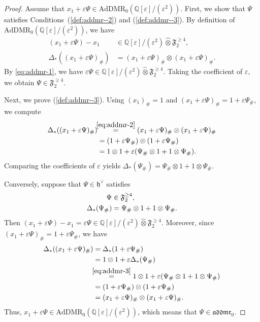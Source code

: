 \documentclass[15pt,oneside,reqno]{amsart}
\theoremstyle{remark}{
\newtheorem{lem}[df]{Lemma}
\newtheorem{prop}[df]{Proposition}
\newtheorem{ex}[df]{Example}
\newtheorem{rmk}[df]{Remark}
}
\newcommand{\ide}[1]{\mathfrak{#1}}
\newcommand{\Q}{\mathbb{Q}}
\newcommand{\AdDMR}{\mathrm{AdDMR}}
\newcommand{\addmr}{\mathfrak{addmr}}
\newcommand{\cotimes}{\widehat{\otimes}}
\begin{document}
\begin{proof}
Assume that $x_1 + \varepsilon \Psi \in \AdDMR_0(\Q[\varepsilon]/(\varepsilon^{2}))$.
First, we show that $\Psi$ satisfies Conditions~(\ref{def:addmr--2}) and (\ref{def:addmr--3}).
By definition of $\AdDMR_0(\Q[\varepsilon]/(\varepsilon^{2}))$, we have
\begin{align}
(x_1 + \varepsilon \Psi) - x_1  &\in \Q[\varepsilon]/(\varepsilon^2) \cotimes \ide{F}_2^{\ge 4}, \label{eq:addmr-1}\\
\Delta_{*} ((x_1 + \varepsilon \Psi)_{\#})
&= (x_1 + \varepsilon \Psi)_{\#} \otimes (x_1 + \varepsilon \Psi)_{\#}. \label{eq:addmr-2}
\end{align}
By \eqref{eq:addmr-1}, we have $\varepsilon\Psi\in \Q[\varepsilon]/(\varepsilon^2)\cotimes \ide{F}_2^{\ge 4}$.
Taking the coefficient of $\varepsilon$, we obtain $\Psi\in \ide{F}_2^{\ge 4}$.

Next, we prove (\ref{def:addmr--3}).
Using $(x_1)_{\#}=1$ and $(x_1+\varepsilon\Psi)_{\#}=1+\varepsilon\Psi_{\#}$, we compute
\begin{align*}
\Delta_{*}((x_1 + \varepsilon \Psi)_{\#})
&\hspace{-0.15cm}\stackrel{\eqref{eq:addmr-2}}{=} (x_1 + \varepsilon \Psi)_{\#}\otimes (x_1 + \varepsilon \Psi)_{\#} \\
&=(1 + \varepsilon \Psi_{\#})\otimes (1 + \varepsilon \Psi_{\#})\\
&= 1\otimes 1 + \varepsilon(\Psi_{\#} \otimes 1 + 1\otimes \Psi_{\#}).
\end{align*}
Comparing the coefficients of $\varepsilon$ yields $\Delta_{*}(\Psi_{\#}) = \Psi_{\#} \otimes 1 + 1 \otimes \Psi_{\#}$.

Conversely, suppose that $\Psi \in\ide{h}^{\vee}$ satisfies
\begin{align}
\Psi &\in \ide{F}_2^{\ge4}, \notag\\
\Delta_*(\Psi_\#) &= \Psi_\#\otimes1+1\otimes\Psi_\#. \label{eq:addmr-3}
\end{align}
Then $(x_1+\varepsilon\Psi)-x_1=\varepsilon\Psi\in \Q[\varepsilon]/(\varepsilon^2)\cotimes \ide{F}_2^{\ge4}$.
Moreover, since $(x_1+\varepsilon\Psi)_\#=1+\varepsilon\Psi_\#$, we have
\begin{align*}
\Delta_{*}((x_1 + \varepsilon \Psi)_{\#})
&= \Delta_*(1 + \varepsilon \Psi_{\#}) \\
&= 1\otimes 1 + \varepsilon \Delta_* (\Psi_{\#})\\
&\hspace{-0.15cm}\stackrel{\eqref{eq:addmr-3}}{=} 1\otimes 1  + \varepsilon (\Psi_{\#} \otimes 1 + 1\otimes \Psi_{\#})\\
&= (1 + \varepsilon \Psi_{\#}) \otimes (1 + \varepsilon \Psi_{\#})\\
&= (x_1+\varepsilon\Psi)_\# \otimes (x_1+\varepsilon\Psi)_\#.
\end{align*}
Thus, $x_1+\varepsilon\Psi\in \AdDMR_0(\Q[\varepsilon]/(\varepsilon^2))$, which means that $\Psi\in\addmr_0$.
\end{proof}
\end{document}
